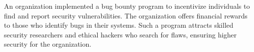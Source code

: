 An organization implemented a bug bounty program to incentivize individuals to find and report security vulnerabilities. The organization offers financial rewards to those who identify bugs in their systems. Such a program attracts skilled security researchers and ethical hackers who search for flaws, ensuring higher security for the organization.